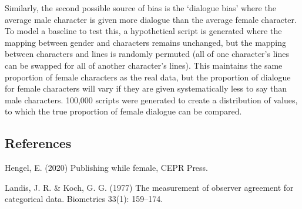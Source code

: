 \documentclass[12pt,a4paper]{article}
\begin{document}
Similarly, the second possible source of bias is the `dialogue bias' where the average male character is given more dialogue than the average female character. To model a baseline to test this, a hypothetical script is generated where the mapping between gender and characters remains unchanged, but the mapping between characters and lines is randomly permuted (all of one character's lines can be swapped for all of another character's lines). This maintains the same proportion of female characters as the real data, but the proportion of dialogue for female characters will vary if they are given systematically less to say than male characters. 100,000 scripts were generated to create a distribution of values, to which the true proportion of female dialogue can be compared.

\subsection*{References}

Hengel, E. (2020) Publishing while female, CEPR Press.

Landis, J. R. \& Koch, G. G. (1977) The measurement of observer agreement for categorical data. Biometrics 33(1): 159–174.
\end{document}
